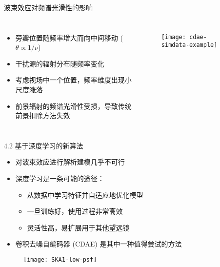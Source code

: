 \documentclass{beamer}
\begin{document}
\begin{frame}[t]
  \begin{alertblock}{波束效应对频谱光滑性的影响}
  \end{alertblock}
  \begin{columns}
    \begin{itemize}
      \item 旁瓣位置随频率增大而向中间移动 ($\theta \propto 1/\nu$)
      \item 干扰源的辐射分布随频率变化
      \item 考虑视场中一个位置，频率维度出现小尺度涨落
      \item 前景辐射的频谱光滑性受损，导致传统前景扣除方法失效
    \end{itemize}

    \begin{figure}
      \centering
      \texttt{[image: cdae-simdata-example]}
    \end{figure}
  \end{columns}
\end{frame}

\begin{frame}{4.2 基于深度学习的新算法}
  \begin{itemize}
    \item 对波束效应进行解析建模几乎不可行
    \item \alert{深度学习}是一条可能的途径：
      \begin{itemize}
        \item 从数据中学习特征并自适应地优化模型
        \item 一旦训练好，使用过程非常高效
        \item 灵活性高，易扩展用于其他望远镜
      \end{itemize}
    \item \alert{卷积去噪自编码器 (CDAE)} 是其中一种值得尝试的方法
  \end{itemize}
  \vspace{-1ex}
  \begin{figure}
    \centering
    \texttt{[image: SKA1-low-psf]}
  \end{figure}
\end{frame}
\end{document}
